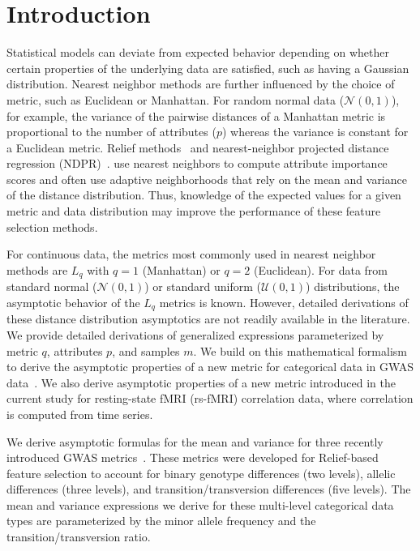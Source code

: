 \documentclass[aoas]{imsart}
\begin{document}
\section*{Introduction}
Statistical models can deviate from expected behavior depending on whether certain properties of the underlying data are satisfied, such as having a Gaussian distribution. Nearest neighbor methods are further influenced by the choice of metric, such as Euclidean or Manhattan. For random normal data ($\mathcal{N}(0,1)$), for example, the variance of the pairwise distances of a Manhattan metric is proportional to the number of attributes ($p$) whereas the variance is constant for a Euclidean metric. Relief methods~\cite{urbanowicz17,urbanowicz17b,robnik2003} and nearest-neighbor projected distance regression (NDPR)~\cite{npdr}. use nearest neighbors to compute attribute importance scores and often use adaptive neighborhoods that rely on the mean and variance of the distance distribution. Thus, knowledge of the expected values for a given metric and data distribution may improve the performance of these feature selection methods. 

For continuous data, the metrics most commonly used in nearest neighbor methods are $L_q$ with $q=1$ (Manhattan) or $q=2$ (Euclidean). For data from standard normal ($\mathcal{N}(0,1)$) or standard uniform ($\mathcal{U}(0,1)$) distributions, the asymptotic behavior of the $L_q$ metrics is known. However, detailed derivations of these distance distribution asymptotics are not readily available in the literature. We provide detailed derivations of generalized expressions parameterized by metric $q$, attributes $p$, and samples $m$. We build on this mathematical formalism to derive the asymptotic properties of a new metric for categorical data in GWAS data~\cite{arabnejad2018}. We also derive asymptotic properties of a new metric introduced in the current study for resting-state fMRI (rs-fMRI) correlation data, where correlation is computed from time series.

We derive asymptotic formulas for the mean and variance for three recently introduced GWAS metrics~\cite{arabnejad2018}. These metrics were developed for Relief-based feature selection to account for binary genotype differences (two levels), allelic differences (three levels), and transition/transversion differences (five levels). The mean and variance expressions we derive for these multi-level categorical data types are parameterized by the minor allele frequency and the transition/transversion ratio. 
\end{document}
